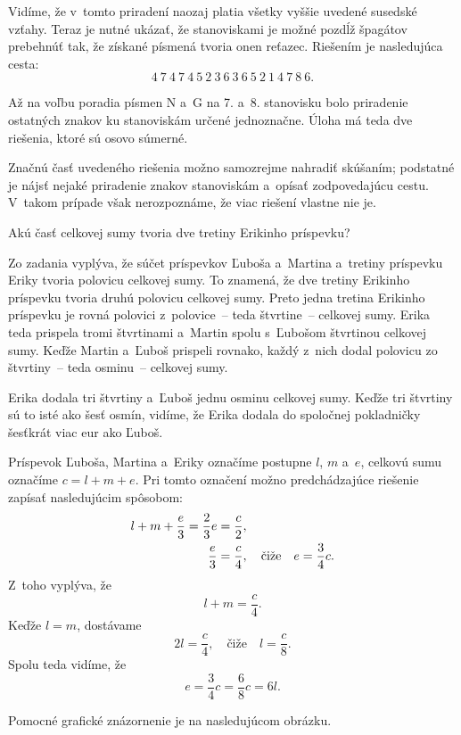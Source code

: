 {Vidíme, že v~tomto priradení naozaj platia všetky vyššie uvedené susedské
vzťahy.
Teraz je nutné ukázať, že stanoviskami je možné pozdĺž špagátov prebehnúť tak,
že získané písmená tvoria onen reťazec.
Riešením je nasledujúca cesta:
$$
4\ 7\ 4\ 7\ 4\ 5\ 2\ 3\ 6\ 3\ 6\ 5\ 2\ 1\ 4\ 7\ 8\ 6.
$$

\poznamka
Až na voľbu poradia písmen N a~G na 7. a~8. stanovisku bolo priradenie
ostatných znakov ku stanoviskám určené jednoznačne.
Úloha má teda dve riešenia, ktoré sú osovo súmerné.

Značnú časť uvedeného riešenia možno samozrejme nahradiť skúšaním;
podstatné je nájsť nejaké priradenie znakov stanoviskám a~opísať
zodpovedajúcu cestu.
V~takom prípade však nerozpoznáme, že viac riešení vlastne nie je.
}

{%
\napad
Akú časť celkovej sumy tvoria dve tretiny Erikinho príspevku?

\riesenie
Zo zadania vyplýva, že súčet príspevkov Ľuboša a~Martina a~tretiny príspevku
Eriky tvoria polovicu celkovej sumy.
To znamená, že dve tretiny Erikinho príspevku tvoria druhú polovicu celkovej
sumy.
Preto jedna tretina Erikinho príspevku je rovná polovici z~polovice~-- teda
štvrtine~-- celkovej sumy.
Erika teda prispela tromi štvrtinami
a~Martin spolu s~Ľubošom štvrtinou celkovej sumy.
Keďže Martin a~Ľuboš prispeli rovnako, každý z~nich dodal polovicu zo
štvrtiny~-- teda osminu~-- celkovej sumy.

Erika dodala tri štvrtiny a~Ľuboš jednu osminu celkovej sumy.
Keďže tri štvrtiny sú to isté ako šesť osmín, vidíme, že Erika dodala do
spoločnej pokladničky šesťkrát viac eur ako Ľuboš.

\poznamky
Príspevok Ľuboša, Martina a~Eriky označíme postupne $l$, $m$ a~$e$, celkovú
sumu označíme $c=l+m+e$.
Pri tomto označení možno predchádzajúce riešenie zapísať nasledujúcim spôsobom:
$$
\aligned
l+m+\frac{e}3=\frac23 e&=\frac{c}2,\\
\frac{e}3&=\frac{c}4,
\quad\text{čiže}\quad
e=\frac34 c.
\endaligned
$$
Z~toho vyplýva, že
$$
l+m=\frac{c}4.
$$
Keďže $l=m$, dostávame
$$
2l=\frac{c}4,
\quad\text{čiže}\quad
l=\frac{c}8.
$$
Spolu teda vidíme, že
$$
e=\frac34 c=\frac68 c=6l.
$$

Pomocné grafické znázornenie je na nasledujúcom obrázku.
%
}

